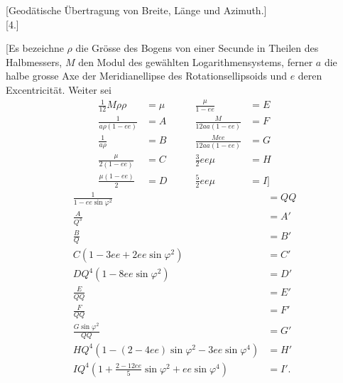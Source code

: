 \par\clearpage
\noindent{}\makebox[12mm][r]{}\par\medskip

\bigskip
\begin{center}
[Geodätische Übertragung von Breite, Länge und Azimuth.]\\[.8ex]
{[4.]}
\end{center}
[Es bezeichne \(\rho\) die Grösse des Bogens von einer Secunde in Theilen des
Halbmessers, \(M\) den Modul des gewählten Logarithmensystems, ferner \(a\) die
halbe grosse Axe der Meridianellipse des Rotationsellipsoids und \(e\) deren
Excentricität. Weiter sei
\[
\begin{alignedat}{2}
\tfrac1{12}M\rho\rho&=\mu &\qquad \frac{\mu}{1-ee}&=E\\
\frac1{a\rho(1-ee)}&=A &\qquad \frac{M}{12aa(1-ee)}&=F\\
\frac1{a\rho}&=B &\qquad \frac{Mee}{12aa(1-ee)}&=G\\
\frac{\mu}{2(1-ee)}&=C &\qquad \tfrac32 ee\mu&=H\\
\frac{\mu(1-ee)}2&=D &\qquad \tfrac52 ee\mu&=I]
\end{alignedat}
\]
\[
\begin{aligned}
\frac1{1-ee\sin\varphi^2}&=QQ\\
\frac A{Q^3}&=A'\\
\frac BQ&=B'\\[.5ex]
C(1-3ee+2ee\sin\varphi^2)&=C'\\
DQ^4(1-8ee\sin\varphi^2)&=D'\\[.5ex]
\frac E{QQ}&=E'\\
\frac F{QQ}&=F'\\
\frac{G\sin\varphi^2}{QQ}&=G'\\[.5ex]
HQ^4(1-(2-4ee)\sin\varphi^2-3ee\sin\varphi^4)&=H'\\
IQ^4\left(1+\frac{2-12ee}{5}\sin\varphi^2+ee\sin\varphi^4\right)&=I'.
\end{aligned}
\]
\par

\par\clearpage
\noindent\makebox[12mm][l]{}\par\medskip

